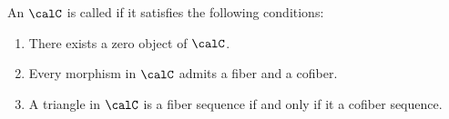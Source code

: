 \begin{definition} \label{definition:stable_infinity_category}
    An  $\calC$ is called  if it satisfies the following conditions:
    \begin{enumerate}
        \item There exists a zero object of $\calC$.
        \item Every morphism in $\calC$ admits a fiber and a cofiber.
        \item A triangle in $\calC$ is a fiber sequence if and only if it a cofiber sequence.
    \end{enumerate}
\end{definition}